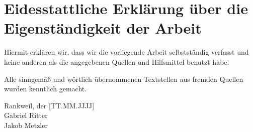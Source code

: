 \chapter{Eidesstattliche Erklärung über die Eigenständigkeit der Arbeit}
Hiermit erklären wir, dass wir die vorliegende Arbeit selbstständig verfasst und keine anderen als die angegebenen Quellen und Hilfsmittel benutzt habe.

Alle sinngemäß und wörtlich übernommenen Textstellen aus fremden Quellen wurden kenntlich gemacht.

Rankweil, der [TT.MM.JJJJ]\\
Gabriel Ritter\\
Jakob Metzler